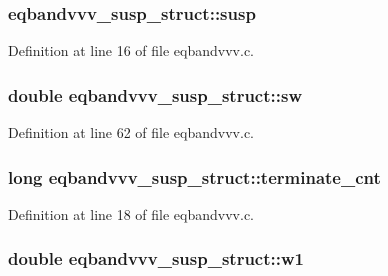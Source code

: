 \subsubsection[{\texorpdfstring{susp}{susp}}]{ eqbandvvv\+\_\+susp\+\_\+struct\+::susp}\hypertarget{structeqbandvvv__susp__struct_a5df859a0b24b474107f34866d35f9f6a}{}\label{structeqbandvvv__susp__struct_a5df859a0b24b474107f34866d35f9f6a}


Definition at line 16 of file eqbandvvv.\+c.

\subsubsection[{\texorpdfstring{sw}{sw}}]{\setlength{\rightskip}{0pt plus 5cm}double eqbandvvv\+\_\+susp\+\_\+struct\+::sw}\hypertarget{structeqbandvvv__susp__struct_a8e76399e6b2b61253d65f93c0d7f7156}{}\label{structeqbandvvv__susp__struct_a8e76399e6b2b61253d65f93c0d7f7156}


Definition at line 62 of file eqbandvvv.\+c.

\subsubsection[{\texorpdfstring{terminate\+\_\+cnt}{terminate_cnt}}]{\setlength{\rightskip}{0pt plus 5cm}long eqbandvvv\+\_\+susp\+\_\+struct\+::terminate\+\_\+cnt}\hypertarget{structeqbandvvv__susp__struct_a1eed22369840718d847dd96e67962c6b}{}\label{structeqbandvvv__susp__struct_a1eed22369840718d847dd96e67962c6b}


Definition at line 18 of file eqbandvvv.\+c.

\subsubsection[{\texorpdfstring{w1}{w1}}]{\setlength{\rightskip}{0pt plus 5cm}double eqbandvvv\+\_\+susp\+\_\+struct\+::w1}\hypertarget{structeqbandvvv__susp__struct_a558bbe37641e8ec3ec1f30898be465f9}{}\label{structeqbandvvv__susp__struct_a558bbe37641e8ec3ec1f30898be465f9}


